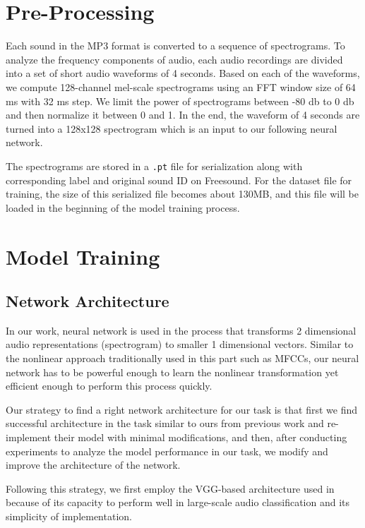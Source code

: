 \section{Pre-Processing}
Each sound in the MP3 format is converted to a sequence of spectrograms. To analyze the frequency components of audio, each audio recordings are divided into a set of short audio waveforms of 4 seconds. Based on each of the waveforms, we compute 128-channel mel-scale spectrograms using an FFT window size of 64 ms with 32 ms step. We limit the power of spectrograms between -80 db to 0 db and then normalize it between 0 and 1. In the end, the waveform of 4 seconds are turned into a 128x128 spectrogram which is an input to our following neural network.

The spectrograms are stored in a \texttt{.pt} file for serialization along with corresponding label and original sound ID on Freesound. For the dataset file for training, the size of this serialized file becomes about 130MB, and this file will be loaded in the beginning of the model training process.

\section{Model Training}
\subsection{Network Architecture}

In our work, neural network is used in the process that transforms 2 dimensional audio representations (spectrogram) to smaller 1 dimensional vectors. Similar to the nonlinear approach traditionally used in this part such as MFCCs, our neural network has to be powerful enough to learn the nonlinear transformation yet efficient enough to perform this process quickly.

Our strategy to find a right network architecture for our task is that first we find successful architecture in the task similar to ours from previous work and re-implement their model with minimal modifications, and then, after conducting experiments to analyze the model performance in our task, we modify and improve the architecture of the network.

Following this strategy, we first employ the VGG-based architecture used in~\cite{hershey2017} because of its capacity to perform well in large-scale audio classification and its simplicity of implementation.


